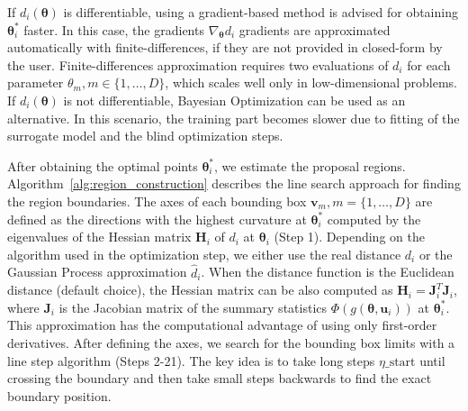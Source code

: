 \documentclass[article]{jss}
\newcommand{\vb}{\mathbf{v}}
\newcommand{\ub}{\mathbf{u}}
\newcommand{\jac}{\mathbf{J}}
\newcommand{\hessian}{\mathbf{H}}
\newcommand{\thetab}{\boldsymbol{\theta}}
\begin{document}
If \(d_i(\thetab)\) is differentiable, using a gradient-based method
is advised for obtaining \(\thetab_i^*\) faster. In this case, the
gradients \(\nabla_{\thetab} d_i\) gradients are approximated
automatically with finite-differences, if they are not provided in
closed-form by the user. Finite-differences approximation requires two
evaluations of \(d_i\) for each parameter
\(\theta_m, m \in \{1, \ldots, D\}\), which scales well only in
low-dimensional problems. If \(d_i(\thetab)\) is not differentiable,
Bayesian Optimization can be used as an alternative. In this scenario,
the training part becomes slower due to fitting of the surrogate model
and the blind optimization steps.

After obtaining the optimal points \(\thetab^*_i\), we estimate the
proposal regions. Algorithm~\ref{alg:region_construction} describes
the line search approach for finding the region boundaries. The axes
of each bounding box \(\vb_m, m = \{1, \ldots, D\}\) are defined as
the directions with the highest curvature at \(\thetab_i^*\) computed
by the eigenvalues of the Hessian matrix \(\hessian_i\) of \(d_i\) at
\(\thetab_i\) (Step 1). Depending on the algorithm used in the
optimization step, we either use the real distance \(d_i\) or the
Gaussian Process approximation \(\hat{d}_i\). When the distance
function is the Euclidean distance (default choice), the Hessian
matrix can be also computed as \(\hessian_i = \jac_i^T\jac_i\), where
\(\jac_i\) is the Jacobian matrix of the summary statistics
\(\Phi(g(\thetab, \ub_i))\) at \(\thetab_i^*\). This approximation has
the computational advantage of using only first-order
derivatives. After defining the axes, we search for the bounding box
limits with a line step algorithm (Steps 2-21). The key idea is to
take long steps \(\eta\_\text{start}\) until crossing the boundary and
then take small steps backwards to find the exact boundary position.
\end{document}
